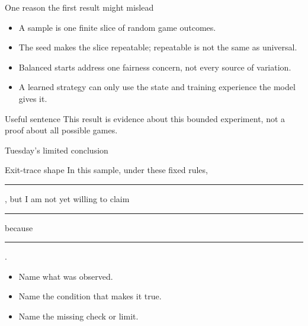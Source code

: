 \begin{frame}{One reason the first result might mislead}
\begin{itemize}
\item A sample is one finite slice of random game outcomes.
\item The seed makes the slice repeatable; repeatable is not the same as universal.
\item Balanced starts address one fairness concern, not every source of variation.
\item A learned strategy can only use the state and training experience the model gives it.
\end{itemize}
\begin{block}{Useful sentence}
This result is evidence about this bounded experiment, not a proof about all possible games.
\end{block}
\end{frame}

\begin{frame}{Tuesday's limited conclusion}
\begin{block}{Exit-trace shape}
In this sample, under these fixed rules, \rule{2.2cm}{0.4pt}, but I am not yet willing to claim \rule{2.2cm}{0.4pt} because \rule{2.2cm}{0.4pt}.
\end{block}
\begin{itemize}
\item Name what was observed.
\item Name the condition that makes it true.
\item Name the missing check or limit.
\end{itemize}
\end{frame}
